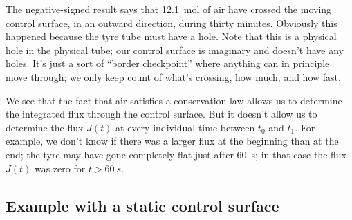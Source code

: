 \documentclass[a4paper,12pt,%
onecolumn,oneside,titlepage,%
british%
]{memoir}
\renewcommand*{\|}[1][]{\nonscript\:#1\vert\nonscript\:\mathopen{}}
\newcommand*{\yJ}{J}
\newcommand*{\yti}{t_{0}}
\newcommand*{\ytf}{t_{1}}
\begin{document}
%
The negative-signed result says that \qty{12.1}{mol} of air have crossed the moving control surface, in an outward direction, during thirty minutes. Obviously this happened because the tyre tube must have a hole.
Note that this is a physical hole in the physical tube; our control surface is imaginary and doesn't have any holes. It's just a sort of \enquote{border checkpoint} where anything can in principle move through; we only keep count of what's crossing, how much, and how fast.

We see that the fact that air satisfies a conservation law allows us to determine the integrated flux through the control surface. But it doesn't allow us to determine the flux $\yJ(t)$ at every individual time between $\yti$ and $\ytf$. For example, we don't know if there was a larger flux at the beginning than at the end; the tyre may have gone completely flat just after \qty{60}{s}; in that case the flux $\yJ(t)$ was zero for $t>\qty{60}{s}$.

\subsection{Example with a static control surface}
\label{sec:example_conservation_static}
\end{document}
